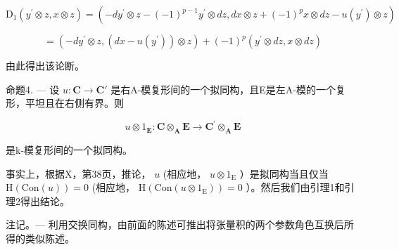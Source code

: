 \[
\mathrm{D} _ {1} \left(y ^ {\prime} \otimes z, x \otimes z\right) = (- d y ^ {\prime} \otimes z - (- 1) ^ {p - 1} y ^ {\prime} \otimes d z, d x \otimes z + (- 1) ^ {p} x \otimes d z - u \left(y ^ {\prime}\right) \otimes z)
\]

\[
= \left(- d y ^ {\prime} \otimes z, (d x - u (y ^ {\prime})) \otimes z\right) + (- 1) ^ {p} \left(y ^ {\prime} \otimes d z, x \otimes d z\right)
\]

由此得出该论断。

命题4. — 设 \(u: \mathbf{C} \to \mathbf{C}'\) 是右A-模复形间的一个拟同构，且E是左A-模的一个复形，平坦且在右侧有界。则

\[
u \otimes 1 _ {\mathbf {E}}: \mathbf {C} \otimes_ {\mathbf {A}} \mathbf {E} \rightarrow \mathbf {C} ^ {\prime} \otimes_ {\mathbf {A}} \mathbf {E}
\]

是k-模复形间的一个拟同构。

事实上，根据X，第38页，推论， \(u\) (相应地， \(u \otimes 1_{\mathrm{E}}\) ）是拟同构当且仅当 \(\mathrm{H}(\mathrm{Con}(u)) = 0\) (相应地， \(\mathrm{H}(\mathrm{Con}(u \otimes 1_{\mathrm{E}})) = 0\) ）。然后我们由引理1和引理2得出结论。

注记。--- 利用交换同构，由前面的陈述可推出将张量积的两个参数角色互换后所得的类似陈述。

